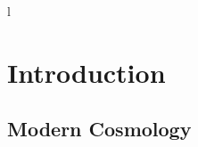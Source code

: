 
l\chapter{Introduction} %

\label{Introduction} %


\newcommand{\keyword}[1]{\textbf{#1}}
\newcommand{\tabhead}[1]{\textbf{#1}}
\newcommand{\code}[1]{\texttt{#1}}
\newcommand{\file}[1]{\texttt{\bfseries#1}}
\newcommand{\option}[1]{\texttt{\itshape#1}}


\section{Modern Cosmology}
 
